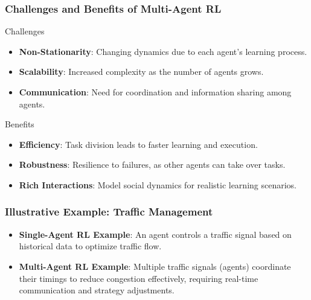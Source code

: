 \documentclass[aspectratio=169]{beamer}
\begin{document}
\begin{frame}[fragile]
    \frametitle{Challenges and Benefits of Multi-Agent RL}
    \begin{block}{Challenges}
        \begin{itemize}
            \item \textbf{Non-Stationarity}: Changing dynamics due to each agent's learning process.
            \item \textbf{Scalability}: Increased complexity as the number of agents grows.
            \item \textbf{Communication}: Need for coordination and information sharing among agents.
        \end{itemize}
    \end{block}

    \begin{block}{Benefits}
        \begin{itemize}
            \item \textbf{Efficiency}: Task division leads to faster learning and execution.
            \item \textbf{Robustness}: Resilience to failures, as other agents can take over tasks.
            \item \textbf{Rich Interactions}: Model social dynamics for realistic learning scenarios.
        \end{itemize}
    \end{block}
\end{frame}

\begin{frame}[fragile]
    \frametitle{Illustrative Example: Traffic Management}
    \begin{itemize}
        \item \textbf{Single-Agent RL Example}: An agent controls a traffic signal based on historical data to optimize traffic flow.
        \item \textbf{Multi-Agent RL Example}: Multiple traffic signals (agents) coordinate their timings to reduce congestion effectively, requiring real-time communication and strategy adjustments.
    \end{itemize}
\end{frame}
\end{document}
